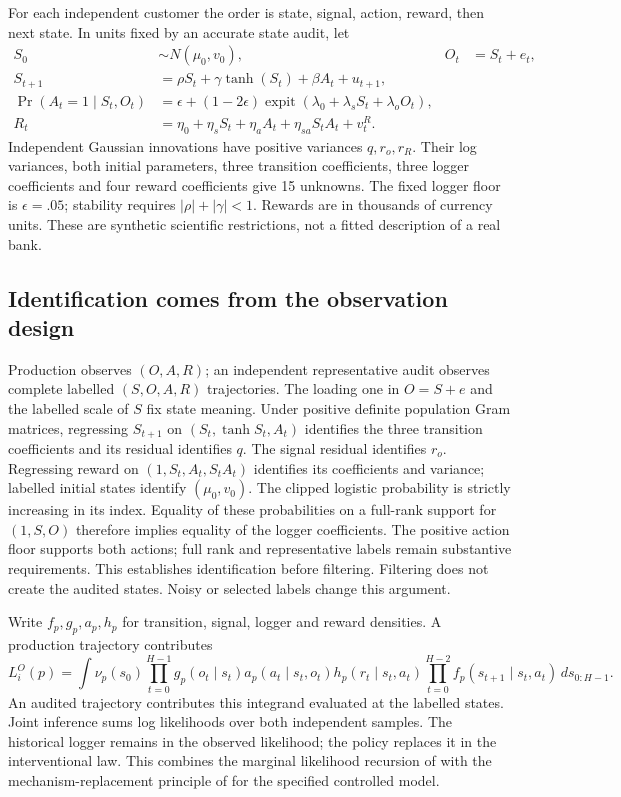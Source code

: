For each independent customer the order is state, signal, action, reward,
then next state. In units fixed by an accurate state audit, let
\begin{align}
 S_0&\sim N(\mu_0,v_0), & O_t&=S_t+e_t,\\
 S_{t+1}&=\rho S_t+\gamma\tanh(S_t)+\beta A_t+u_{t+1},\nonumber\\
 \Pr(A_t=1\mid S_t,O_t)&=\epsilon+(1-2\epsilon)
       \operatorname{expit}(\lambda_0+\lambda_sS_t+\lambda_oO_t),\nonumber\\
 R_t&=\eta_0+\eta_s S_t+\eta_a A_t+\eta_{sa}S_tA_t+v_t^R.
 \label{c7:nonlinear-law}
\end{align}
Independent Gaussian innovations have positive variances $q,r_o,r_R$.
Their log variances, both initial parameters, three transition coefficients,
three logger coefficients and four reward coefficients give 15 unknowns.
The fixed logger floor is $\epsilon=.05$; stability requires
$|\rho|+|\gamma|<1$. Rewards are in thousands of currency units. These are
synthetic scientific restrictions, not a fitted description of a real bank.

\subsection{Identification comes from the observation design}
Production observes $(O,A,R)$; an independent representative audit observes
complete labelled $(S,O,A,R)$ trajectories. The loading one in $O=S+e$ and
the labelled scale of $S$ fix state meaning. Under positive definite population
Gram matrices, regressing $S_{t+1}$ on $(S_t,\tanh S_t,A_t)$ identifies the
three transition coefficients and its residual identifies $q$. The signal
residual identifies $r_o$. Regressing reward on $(1,S_t,A_t,S_tA_t)$ identifies
its coefficients and variance; labelled initial states identify $(\mu_0,v_0)$.
The clipped logistic probability is strictly increasing in its index. Equality
of these probabilities on a full-rank support for $(1,S,O)$ therefore implies
equality of the logger coefficients. The positive action floor supports both
actions; full rank and representative labels remain substantive requirements.
This establishes identification before filtering. Filtering does not create
the audited states. Noisy or selected labels change this argument.

Write $f_p,g_p,a_p,h_p$ for transition, signal, logger and reward densities.
A production trajectory contributes
\begin{equation}
 L_i^O(p)=\int\nu_p(s_0)
  \prod_{t=0}^{H-1}g_p(o_t\mid s_t)a_p(a_t\mid s_t,o_t)h_p(r_t\mid s_t,a_t)
  \prod_{t=0}^{H-2}f_p(s_{t+1}\mid s_t,a_t)\,ds_{0:H-1}.
 \label{c7:nonlinear-likelihood}
\end{equation}
An audited trajectory contributes this integrand evaluated at the labelled
states. Joint inference sums log likelihoods over both independent samples.
The historical logger remains in the observed likelihood; the policy replaces
it in the interventional law. This combines the marginal likelihood recursion
of \citet[Theorem 12.1]{sarkka2013} with the mechanism-replacement principle
of \citet[Corollary 1]{pearl2009} for the specified controlled model.


